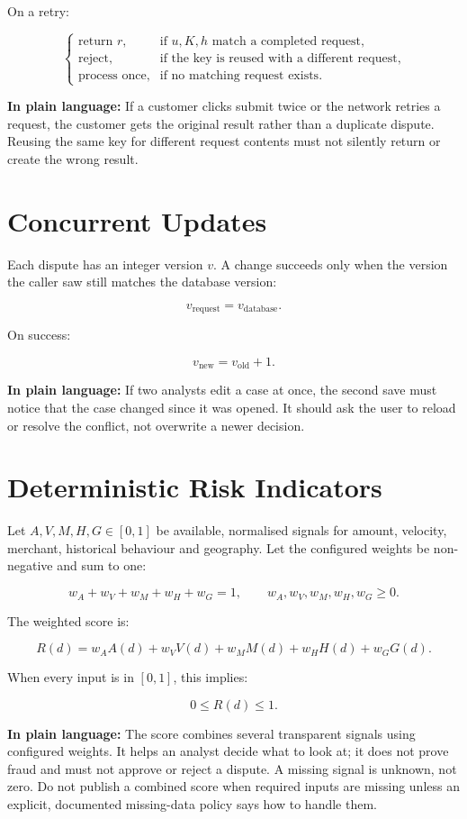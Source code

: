\documentclass[11pt,a4paper]{article}
\begin{document}
On a retry:

\[
\begin{cases}
\text{return }r,
    &\text{if }u,K,h\text{ match a completed request},\\
\text{reject},
    &\text{if the key is reused with a different request},\\
\text{process once},
    &\text{if no matching request exists}.
\end{cases}
\]

\textbf{In plain language:} If a customer clicks submit twice or the
network retries a request, the customer gets the original result rather
than a duplicate dispute. Reusing the same key for different request
contents must not silently return or create the wrong result.

\section{Concurrent Updates}

Each dispute has an integer version \(v\). A change succeeds only when
the version the caller saw still matches the database version:

\[
v_{\mathrm{request}}=v_{\mathrm{database}}.
\]

On success:

\[
v_{\mathrm{new}}=v_{\mathrm{old}}+1.
\]

\textbf{In plain language:} If two analysts edit a case at once, the
second save must notice that the case changed since it was opened. It
should ask the user to reload or resolve the conflict, not overwrite a
newer decision.

\section{Deterministic Risk Indicators}

Let \(A,V,M,H,G\in[0,1]\) be available, normalised signals for amount,
velocity, merchant, historical behaviour and geography. Let the
configured weights be non-negative and sum to one:

\[
w_A+w_V+w_M+w_H+w_G=1,
\qquad
w_A,w_V,w_M,w_H,w_G\geq0.
\]

The weighted score is:

\[
R(d)=w_AA(d)+w_VV(d)+w_MM(d)+w_HH(d)+w_GG(d).
\]

When every input is in \([0,1]\), this implies:

\[
0\leq R(d)\leq1.
\]

\textbf{In plain language:} The score combines several transparent
signals using configured weights. It helps an analyst decide what to
look at; it does not prove fraud and must not approve or reject a
dispute. A missing signal is unknown, not zero. Do not publish a
combined score when required inputs are missing unless an explicit,
documented missing-data policy says how to handle them.
\end{document}
